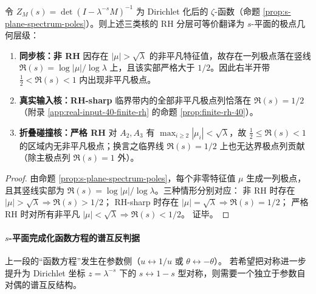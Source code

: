 \begin{corollary}\label{cor:rh-stratification-splane}
令 \(Z_M(s)=\det(I-\lambda^{-s}M)^{-1}\) 为 Dirichlet 化后的 \(\zeta\)-函数（命题 \ref{prop:s-plane-spectrum-poles}）。则上述三类核的 RH 分层可等价翻译为 \(s\)-平面的极点几何层级：
\begin{enumerate}
  \item \textbf{同步核：非 RH} 因存在 \(|\mu|>\sqrt{\lambda}\) 的非平凡特征值，故存在一列极点落在竖线
  \(
  \Re(s)=\log|\mu|/\log\lambda
  \)
  上，且该实部严格大于 \(1/2\)。因此右半开带 \(\tfrac12<\Re(s)<1\) 内出现非平凡极点。
  \item \textbf{真实输入核：RH-sharp} 临界带内的全部非平凡极点列恰落在 \(\Re(s)=1/2\)（附录 \ref{app:real-input-40-finite-rh} 的命题 \ref{prop:finite-rh-40}）。
  \item \textbf{折叠碰撞核：严格 RH} 对 \(A_2,A_3\) 有 \(\max_{i\ge 2}|\mu_i|<\sqrt{\lambda}\)，故 \(\tfrac12\le \Re(s)<1\) 的区域内无非平凡极点；换言之临界线 \(\Re(s)=1/2\) 上也无达界极点列贡献（除主极点列 \(\Re(s)=1\) 外）。
\end{enumerate}
\end{corollary}
\begin{proof}
由命题 \ref{prop:s-plane-spectrum-poles}，每个非零特征值 \(\mu\) 生成一列极点，且其竖线实部为 \(\Re(s)=\log|\mu|/\log\lambda\)。三种情形分别对应：
非 RH 时存在 \(|\mu|>\sqrt{\lambda}\Rightarrow \Re(s)>1/2\)；
RH-sharp 时存在 \(|\mu|=\sqrt{\lambda}\Rightarrow \Re(s)=1/2\)；
严格 RH 时对所有非平凡 \(|\mu|<\sqrt{\lambda}\Rightarrow \Re(s)<1/2\)。
证毕。
\end{proof}

\paragraph{\texorpdfstring{$s$}{s}-平面完成化函数方程的谱互反判据}\label{par:s-plane-functional-eq-criterion}
上一段的“函数方程”发生在参数侧（$u\leftrightarrow 1/u$ 或 $\theta\leftrightarrow-\theta$）。
若希望把对称进一步提升为 Dirichlet 坐标 $z=\lambda^{-s}$ 下的
\(
s\leftrightarrow 1-s
\)
型对称，则需要一个独立于参数自对偶的谱互反结构。

